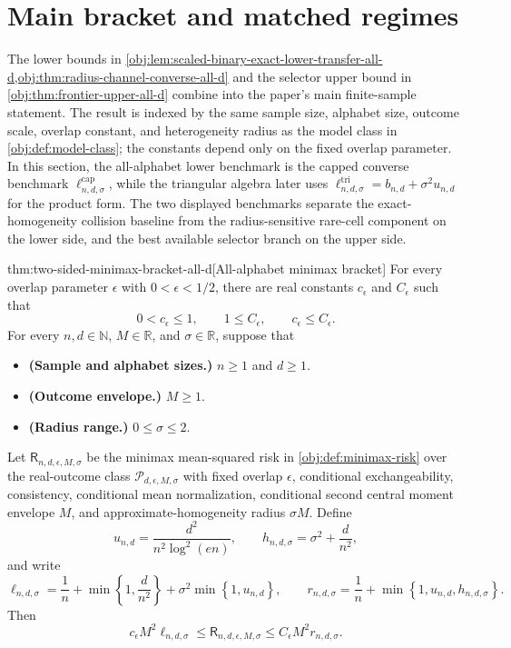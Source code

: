 \documentclass[11pt]{article}
\begin{document}
\section{Main bracket and matched regimes}

The lower bounds in \cref{obj:lem:scaled-binary-exact-lower-transfer-all-d,obj:thm:radius-channel-converse-all-d} and the selector upper bound in \cref{obj:thm:frontier-upper-all-d} combine into the paper's main finite-sample statement. The result is indexed by the same sample size, alphabet size, outcome scale, overlap constant, and heterogeneity radius as the model class in \cref{obj:def:model-class}; the constants depend only on the fixed overlap parameter. In this section, the all-alphabet lower benchmark is the capped converse benchmark \(\ell^{\mathrm{cap}}_{n,d,\sigma}\), while the triangular algebra later uses \(\ell^{\mathrm{tri}}_{n,d,\sigma}=b_{n,d}+\sigma^2u_{n,d}\) for the product form. The two displayed benchmarks separate the exact-homogeneity collision baseline from the radius-sensitive rare-cell component on the lower side, and the best available selector branch on the upper side.

\begin{theoremv}{thm:two-sided-minimax-bracket-all-d}[All-alphabet minimax bracket]
For every overlap parameter \(\epsilon\) with \(0<\epsilon<1/2\), there are real constants \(c_{\epsilon}\) and \(C_{\epsilon}\) such that
\[
0<c_{\epsilon}\le 1,\qquad 1\le C_{\epsilon},\qquad c_{\epsilon}\le C_{\epsilon}.
\]
For every \(n,d\in\mathbb N\), \(M\in\mathbb R\), and \(\sigma\in\mathbb R\), suppose that
\begin{itemize}
\item \textbf{(Sample and alphabet sizes.)} \(n\ge 1\) and \(d\ge 1\).
\item \textbf{(Outcome envelope.)} \(M\ge 1\).
\item \textbf{(Radius range.)} \(0\le \sigma\le 2\).
\end{itemize}
Let \(\mathsf R_{n,d,\epsilon,M,\sigma}\) be the minimax mean-squared risk in \cref{obj:def:minimax-risk} over the real-outcome class \(\mathcal P_{d,\epsilon,M,\sigma}\) with fixed overlap \(\epsilon\), conditional exchangeability, consistency, conditional mean normalization, conditional second central moment envelope \(M\), and approximate-homogeneity radius \(\sigma M\). Define
\[
u_{n,d}=\frac{d^2}{n^2\log^2(en)},
\qquad
h_{n,d,\sigma}=\sigma^2+\frac{d}{n^2},
\]
and write
\[
\ell_{n,d,\sigma}
=
\frac{1}{n}
+
\min\left\{1,\frac{d}{n^2}\right\}
+
\sigma^2\min\left\{1,u_{n,d}\right\},
\qquad
r_{n,d,\sigma}
=
\frac{1}{n}
+
\min\left\{1,u_{n,d},h_{n,d,\sigma}\right\}.
\]
Then
\[
c_{\epsilon}M^2\ell_{n,d,\sigma}
\le
\mathsf R_{n,d,\epsilon,M,\sigma}
\le
C_{\epsilon}M^2r_{n,d,\sigma}.
\]
\end{theoremv}
\end{document}
